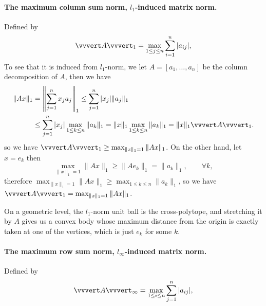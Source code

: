 \documentclass[../main.tex]{subfiles}
\begin{document}
\paragraph{The maximum column sum norm, $l_1$-induced matrix norm. } Defined by
\begin{equation*}
  \vvvert A \vvvert_1 = \max_{1 \leq j \leq n} \sum_{i=1}^n |a_{ij}|,
\end{equation*}
To see that it is induced from $l_1$-norm, we let $A = [a_1, \ldots , a_n]$ be the column decomposition of $A$, then we have
\begin{equation*}
  \begin{aligned}
    \|A x\|_1 &= \left\| \sum_{j=1}^n x_j a_j \right\|_1 \leq \sum_{j=1}^n |x_j| \|a_j\|_1 \\
    & \leq \sum_{j=1}^n |x_j| \max_{1 \leq k \leq n} \|a_k\|_1 = \|x\|_1 \max_{1 \leq k \leq n} \|a_k\|_1 = \|x\|_1 \vvvert A \vvvert_1.
  \end{aligned}    
\end{equation*}
so we have $\vvvert A \vvvert_1 \geq \max_{\|x\|_1 = 1} \|A x\|_1$. On the other hand, let $x = e_k$ then
\begin{equation*}
  \max_{\|x\|_1 = 1} \|A x\|_1 \geq \|A e_k\|_1 = \|a_k\|_1, \qquad \forall k,
\end{equation*}
therefore $\max_{\|x\|_1 = 1} \|A x\|_1 \geq \max_{1 \leq k \leq n} \|a_k\|_1$, so we have $\vvvert A \vvvert_1 = \max_{\|x\|_1 = 1} \|A x\|_1$.

\begin{remark}
  On a geometric level, the $l_1$-norm unit ball is the cross-polytope, and stretching it by $A$ gives us a convex body whose maximum distance from the origin is exactly taken at one of the vertices, which is just $e_k$ for some $k$.
\end{remark}

\paragraph{The maximum row sum norm, $l_\infty$-induced matrix norm. } Defined by
\begin{equation*} 
  \vvvert A \vvvert_\infty = \max_{1 \leq i \leq n} \sum_{j=1}^n |a_{ij}|,
\end{equation*}
\end{document}
